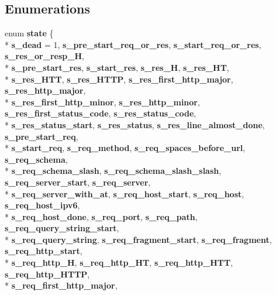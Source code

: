 \subsection*{Enumerations}
\begin{DoxyCompactItemize}
\item 
enum {\bf state} \{ \\*
{\bf s\+\_\+dead} = 1, 
{\bf s\+\_\+pre\+\_\+start\+\_\+req\+\_\+or\+\_\+res}, 
{\bf s\+\_\+start\+\_\+req\+\_\+or\+\_\+res}, 
{\bf s\+\_\+res\+\_\+or\+\_\+resp\+\_\+H}, 
\\*
{\bf s\+\_\+pre\+\_\+start\+\_\+res}, 
{\bf s\+\_\+start\+\_\+res}, 
{\bf s\+\_\+res\+\_\+H}, 
{\bf s\+\_\+res\+\_\+\+HT}, 
\\*
{\bf s\+\_\+res\+\_\+\+H\+TT}, 
{\bf s\+\_\+res\+\_\+\+H\+T\+TP}, 
{\bf s\+\_\+res\+\_\+first\+\_\+http\+\_\+major}, 
{\bf s\+\_\+res\+\_\+http\+\_\+major}, 
\\*
{\bf s\+\_\+res\+\_\+first\+\_\+http\+\_\+minor}, 
{\bf s\+\_\+res\+\_\+http\+\_\+minor}, 
{\bf s\+\_\+res\+\_\+first\+\_\+status\+\_\+code}, 
{\bf s\+\_\+res\+\_\+status\+\_\+code}, 
\\*
{\bf s\+\_\+res\+\_\+status\+\_\+start}, 
{\bf s\+\_\+res\+\_\+status}, 
{\bf s\+\_\+res\+\_\+line\+\_\+almost\+\_\+done}, 
{\bf s\+\_\+pre\+\_\+start\+\_\+req}, 
\\*
{\bf s\+\_\+start\+\_\+req}, 
{\bf s\+\_\+req\+\_\+method}, 
{\bf s\+\_\+req\+\_\+spaces\+\_\+before\+\_\+url}, 
{\bf s\+\_\+req\+\_\+schema}, 
\\*
{\bf s\+\_\+req\+\_\+schema\+\_\+slash}, 
{\bf s\+\_\+req\+\_\+schema\+\_\+slash\+\_\+slash}, 
{\bf s\+\_\+req\+\_\+server\+\_\+start}, 
{\bf s\+\_\+req\+\_\+server}, 
\\*
{\bf s\+\_\+req\+\_\+server\+\_\+with\+\_\+at}, 
{\bf s\+\_\+req\+\_\+host\+\_\+start}, 
{\bf s\+\_\+req\+\_\+host}, 
{\bf s\+\_\+req\+\_\+host\+\_\+ipv6}, 
\\*
{\bf s\+\_\+req\+\_\+host\+\_\+done}, 
{\bf s\+\_\+req\+\_\+port}, 
{\bf s\+\_\+req\+\_\+path}, 
{\bf s\+\_\+req\+\_\+query\+\_\+string\+\_\+start}, 
\\*
{\bf s\+\_\+req\+\_\+query\+\_\+string}, 
{\bf s\+\_\+req\+\_\+fragment\+\_\+start}, 
{\bf s\+\_\+req\+\_\+fragment}, 
{\bf s\+\_\+req\+\_\+http\+\_\+start}, 
\\*
{\bf s\+\_\+req\+\_\+http\+\_\+H}, 
{\bf s\+\_\+req\+\_\+http\+\_\+\+HT}, 
{\bf s\+\_\+req\+\_\+http\+\_\+\+H\+TT}, 
{\bf s\+\_\+req\+\_\+http\+\_\+\+H\+T\+TP}, 
\\*
{\bf s\+\_\+req\+\_\+first\+\_\+http\+\_\+major}, 

\end{DoxyCompactItemize}
